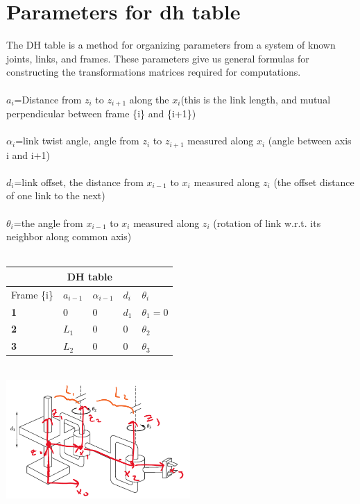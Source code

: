 \documentclass{article}
\begin{document}
\section{Parameters for dh table}
The DH table is a method for organizing parameters from a system of known joints, links, and frames. These parameters give us general formulas for constructing the transformations matrices required for computations. \\\\
$a_i$=Distance from $z_{i}$ to $z_{i+1}$ along the $x_i$(this is the link length, and mutual perpendicular between frame \{i\} and \{i+1\})\\\\
$\alpha_i$=link twist angle, angle from $z_{i}$ to $z_{i+1}$ measured along $x_{i}$ (angle between axis i and i+1)\\\\
$d_i$=link offset, the distance from $x_{i-1}$ to $x_{i}$ measured along $z_{i}$ (the offset distance of one link to the next)\\\\
$\theta_i$=the angle from $x_{i-1}$ to $x_{i}$ measured along $z_{i}$ (rotation of link w.r.t. its neighbor along common axis)\\\\

\begin{tabular}{ |p{3cm}|p{3cm}|p{3cm}| p{3cm} | p{3cm} |}
\hline
\multicolumn{5}{|c|}{DH table} \\
\hline
Frame \{i\} & \textbf{$a_{i-1}$} & \textbf{$\alpha_{i-1}$} & \textbf{$d_i$} & \textbf{$\theta_i$} \\
\hline
\textbf{1} & 0     & 0 & $d_1$ & $\theta_1=0$\\
\textbf{2} & $L_1$ & 0 & 0 & $\theta_2$\\
\textbf{3} & $L_2$ & 0 & 0 & $\theta_3$\\
\hline
\end{tabular}\\
\includegraphics[width=7cm]{PRR_labeled2.png}
\end{document}
